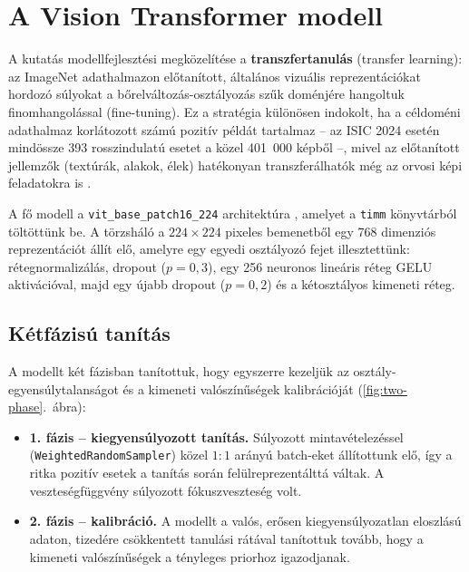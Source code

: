 \section{A Vision Transformer modell}

A kutatás modellfejlesztési megközelítése a \textbf{transzfertanulás} (transfer
learning): az ImageNet adathalmazon előtanított, általános vizuális
reprezentációkat hordozó súlyokat a bőrelváltozás-osztályozás szűk doménjére
hangoltuk finomhangolással (fine-tuning). Ez a stratégia különösen indokolt, ha
a céldoméni adathalmaz korlátozott számú pozitív példát tartalmaz -- az ISIC 2024
esetén mindössze 393 rosszindulatú esetet a közel 401~000 képből --, mivel az
előtanított jellemzők (textúrák, alakok, élek) hatékonyan transzferálhatók
még az orvosi képi feladatokra is \cite{raghu2019transfusion}.

A fő modell a \texttt{vit\_base\_patch16\_224} architektúra
\cite{dosovitskiy2021vit}, amelyet a \texttt{timm} könyvtárból
\cite{wightman2019timm} töltöttünk be. A törzsháló a $224 \times 224$ pixeles
bemenetből egy 768 dimenziós reprezentációt állít elő, amelyre egy egyedi
osztályozó fejet illesztettünk: rétegnormalizálás, dropout ($p=0{,}3$), egy 256
neuronos lineáris réteg GELU aktivációval, majd egy újabb dropout ($p=0{,}2$) és
a kétosztályos kimeneti réteg.

\subsection{Kétfázisú tanítás}

A modellt két fázisban tanítottuk, hogy egyszerre kezeljük az
osztály-egyensúlytalanságot és a kimeneti valószínűségek kalibrációját
(\ref{fig:two-phase}.~ábra):

\begin{itemize}
  \item \textbf{1. fázis -- kiegyensúlyozott tanítás.} Súlyozott
  mintavételezéssel (\texttt{WeightedRandomSampler}) közel $1{:}1$ arányú
  batch-eket állítottunk elő, így a ritka pozitív esetek a tanítás során
  felülreprezentálttá váltak. A veszteségfüggvény súlyozott fókuszveszteség
  \cite{lin2017focal} volt.
  \item \textbf{2. fázis -- kalibráció.} A modellt a valós, erősen
  kiegyensúlyozatlan eloszlású adaton, tizedére csökkentett tanulási rátával
  tanítottuk tovább, hogy a kimeneti valószínűségek a tényleges priorhoz
  igazodjanak.
\end{itemize}

